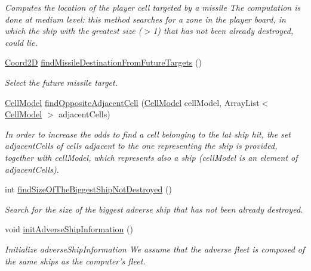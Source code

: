 \begin{DoxyCompactItemize}
\begin{DoxyCompactList}\small\item\em Computes the location of the player cell targeted by a missile The computation is done at medium level\-: this method searches for a zone in the player board, in which the ship with the greatest size ($>$1) that has not been already destroyed, could lie. \end{DoxyCompactList}\item 
\hyperlink{classbattleship2D_1_1model_1_1Coord2D}{Coord2\-D} \hyperlink{classbattleship2D_1_1ui_1_1BoardUIComputer_ae895f4892488717da8d778264c963cb3}{find\-Missile\-Destination\-From\-Future\-Targets} ()
\begin{DoxyCompactList}\small\item\em Select the future missile target. \end{DoxyCompactList}\item 
\hyperlink{classbattleship2D_1_1model_1_1CellModel}{Cell\-Model} \hyperlink{classbattleship2D_1_1ui_1_1BoardUIComputer_aae69c40ffb435b086ccb725670840619}{find\-Opposite\-Adjacent\-Cell} (\hyperlink{classbattleship2D_1_1model_1_1CellModel}{Cell\-Model} cell\-Model, Array\-List$<$ \hyperlink{classbattleship2D_1_1model_1_1CellModel}{Cell\-Model} $>$ adjacent\-Cells)
\begin{DoxyCompactList}\small\item\em In order to increase the odds to find a cell belonging to the lat ship hit, the set adjacent\-Cells of cells adjacent to the one representing the ship is provided, together with cell\-Model, which represents also a ship (cell\-Model is an element of adjacent\-Cells). \end{DoxyCompactList}\item 
int \hyperlink{classbattleship2D_1_1ui_1_1BoardUIComputer_abd860959bf0e63c9bbf089a96d1e38b4}{find\-Size\-Of\-The\-Biggest\-Ship\-Not\-Destroyed} ()
\begin{DoxyCompactList}\small\item\em Search for the size of the biggest adverse ship that has not been already destroyed. \end{DoxyCompactList}\item 
void \hyperlink{classbattleship2D_1_1ui_1_1BoardUIComputer_af7b50be2e65d26ec9548625ff79bd671}{init\-Adverse\-Ship\-Information} ()
\begin{DoxyCompactList}\small\item\em Initialize adverse\-Ship\-Information We assume that the adverse fleet is composed of the same ships as the computer's fleet. \end{DoxyCompactList}\item 

\end{DoxyCompactItemize}
